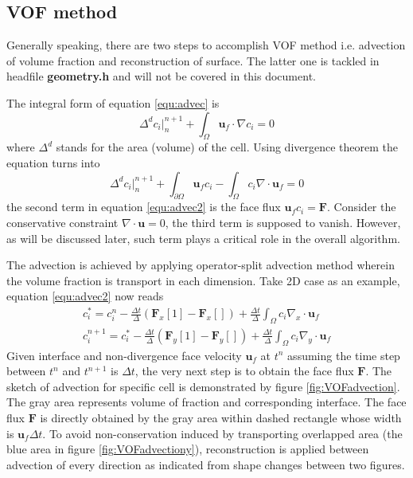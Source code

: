 \subsection{VOF method}
Generally speaking, there are two steps to accomplish VOF method i.e. advection of volume fraction and reconstruction of surface. The latter one is tackled in headfile \textbf{geometry.h} and will not be covered in this document.\par
 The integral form of equation \ref{equ:advec} is
\begin{equation}
    \Delta^{d} c_i|^{n+1}_{n} + \int_{\Omega}\mathbf{u}_f\cdot\nabla c_i= 0
\end{equation}
where $\Delta^d$ stands for the area (volume) of the cell.
Using divergence theorem the equation turns into
\begin{equation}\label{equ:advec2}
    \Delta^{d} c_i|^{n+1}_{n} + \int_{\partial\Omega}\mathbf{u}_f c_i - \int_{\Omega}c_i\nabla\cdot \mathbf{u}_f= 0
\end{equation}
the second term in equation \ref{equ:advec2} is the face flux $\mathbf{u}_fc_i=\mathbf{F}$. Consider the conservative constraint $\nabla\cdot\mathbf{u}=0$, the third term is supposed to vanish. However, as will be discussed later, such term plays a critical role in the overall algorithm.\par
The advection is achieved by applying operator-split advection method\cite{2011_Gretar} wherein the volume fraction is transport in each dimension. Take 2D case as an example, equation \ref{equ:advec2} now reads
\begin{align}
    c_i^\ast = c_i^{n} - \frac{\Delta t}{\Delta}(\mathbf{F}_x[1]-\mathbf{F}_x[]) + \frac{\Delta t}{\Delta}\int_{\Omega}c_i\nabla_x\cdot\mathbf{u}_f\label{equ:advec3x}\\
    c_i^{n+1} = c_i^\ast - \frac{\Delta t}{\Delta}(\mathbf{F}_y[1]-\mathbf{F}_y[]) + \frac{\Delta t}{\Delta} \int_{\Omega}c_i\nabla_y\cdot\mathbf{u}_f
\end{align}
Given interface and non-divergence face velocity $\mathbf{u}_f$ at $t^n$ assuming the time step between $t^{n}$ and $t^{n+1}$ is $\Delta t$, the very next step is to obtain the face flux $\mathbf{F}$. The sketch of advection for specific cell is demonstrated by figure \ref{fig:VOFadvection}. The gray area represents volume of fraction and corresponding interface.
The face flux $\mathbf{F}$ is directly obtained by the gray area within dashed rectangle whose width is $\mathbf{u}_f\Delta t$. To avoid non-conservation induced by transporting overlapped area (the blue area in figure \ref{fig:VOFadvectiony}), reconstruction is applied between advection of every direction as indicated from shape changes between two figures.\par
